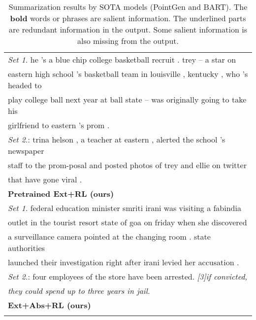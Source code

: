 \begin{table}[th]
\begin{center}
\begin{tabular}{|p{7.5cm}|}
\cut{%
\hline \bf Pretrained Ext (ours) \\
\hline \textit{Set 1.} he 's a blue chip college basketball recruit . trey -- a star on \\
       eastern high school 's basketball team in louisville , kentucky , who 's headed to \\
	   play college ball next year at ball state -- was originally going to take his \\
	   girlfriend to eastern 's prom .\\
	   \textit{Set 2.}: trina helson , a teacher at eastern , alerted the school 's newspaper \\
	   staff to the prom-posal and posted photos of trey and ellie on twitter\\
	   that have gone viral . \\
\hline \bf Pretrained Ext+RL (ours) \\
\hline \textit{Set 1.} federal education minister smriti irani was visiting a fabindia \\
       outlet in the tourist resort state of goa on friday when she discovered \\
	   a surveillance camera pointed at the changing room . state authorities \\
	   launched their investigation right after irani levied her accusation .\\
	   \textit{Set 2.}: four employees of the store have been arrested. \textit{[3]if convicted,} \\
	   \textit{they could spend up to three years in jail.} \\
\hline \bf Ext+Abs+RL (ours) \\
}%
\hline
\end{tabular}
\end{center}
\caption{Summarization results by SOTA models (PointGen and
BART). 
The \textbf{bold} words or phrases are salient information. 
The underlined parts are redundant information in the output.
Some salient information is also missing from the output.
}\label{tab:example}  
\end{table}

